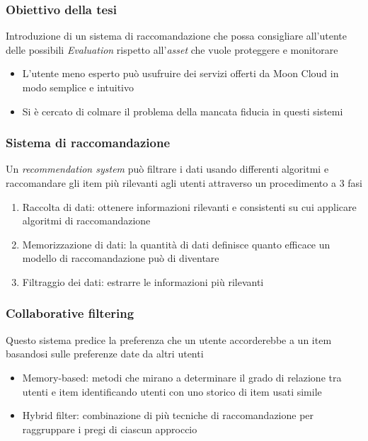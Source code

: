 \begin{frame}
    \frametitle{Obiettivo della tesi}
    Introduzione di un \alert{sistema di raccomandazione} che possa consigliare all'utente delle possibili \textit{Evaluation} rispetto 
    all'\textit{asset} che vuole proteggere e monitorare
    \begin{itemize}
        \item L'utente meno esperto può usufruire dei servizi offerti da Moon Cloud in modo \alert{semplice} e \alert{intuitivo}
        \item Si è cercato di colmare il problema della mancata fiducia in questi sistemi
    \end{itemize}
\end{frame}

\begin{frame}
    \frametitle{Sistema di raccomandazione}
    Un \textit{recommendation system} può filtrare i dati usando differenti algoritmi e raccomandare gli item più rilevanti agli utenti attraverso 
    un procedimento a 3 fasi
    \begin{enumerate}
        \item \alert{Raccolta di dati}: ottenere informazioni rilevanti e consistenti su cui applicare algoritmi di raccomandazione
        \item \alert{Memorizzazione di dati}: la quantità di dati definisce quanto efficace un modello di raccomandazione può di diventare
        \item \alert{Filtraggio dei dati}: estrarre le informazioni più rilevanti
    \end{enumerate}
\end{frame}

\begin{frame}
    \frametitle{Collaborative filtering}
    Questo sistema predice la preferenza che un utente accorderebbe a un item basandosi sulle preferenze date da altri utenti
    \begin{itemize}
        \item Memory-based: metodi che mirano a determinare il grado di relazione tra utenti e item identificando 
        utenti con uno storico di item usati simile
        \item Hybrid filter: combinazione di più tecniche di raccomandazione per raggruppare i pregi di ciascun approccio
    \end{itemize}
\end{frame}

